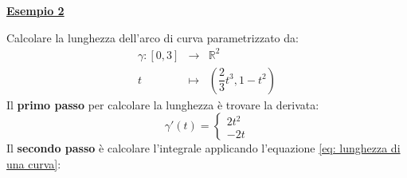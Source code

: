 \documentclass[a4paper]{article}
\newcommand{\example}[1]{\textcolor{Green4}{\textbf{#1}}}
\begin{document}
	\begin{flushleft}
		\example{\underline{Esempio 2}}
	\end{flushleft}
	Calcolare la lunghezza dell'arco di curva parametrizzato da:
	\begin{equation*}
		\begin{array}{rcl}
			\gamma : \left[0,3\right] &\rightarrow& \mathbb{R}^{2} \\
			t &\mapsto& \left(\dfrac{2}{3}t^{3}, 1-t^{2}\right)
		\end{array}
	\end{equation*}
	Il \textbf{primo passo} per calcolare la lunghezza è trovare la derivata:
	\begin{equation*}
		\gamma'\left(t\right) = \begin{cases}
			2t^{2} \\
			-2t
		\end{cases}
	\end{equation*}
	Il \textbf{secondo passo} è calcolare l'integrale applicando l'equazione \ref{eq: lunghezza di una curva}:
\end{document}
